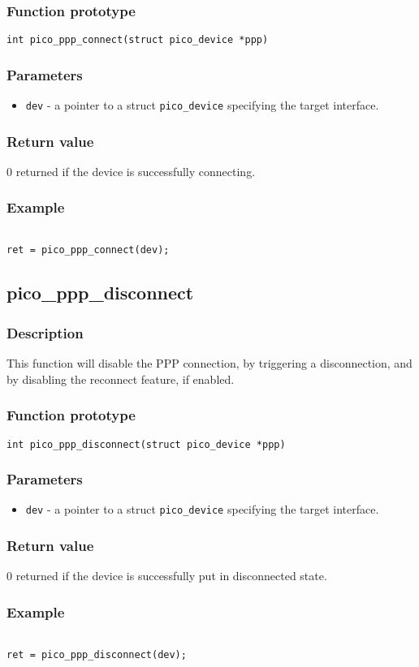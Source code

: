 \subsubsection*{Function prototype}
\texttt{int pico\_ppp\_connect(struct pico\_device *ppp)}

\subsubsection*{Parameters}
\begin{itemize}[noitemsep]
\item \texttt{dev} - a pointer to a struct \texttt{pico\_device} specifying the target interface.
\end{itemize}

\subsubsection*{Return value}
0 returned if the device is successfully connecting.

\subsubsection*{Example}
\begin{verbatim}

ret = pico_ppp_connect(dev);

\end{verbatim}
\subsection{pico\_ppp\_disconnect}
\subsubsection*{Description}
This function will disable the PPP connection, by triggering a disconnection, and by disabling the
reconnect feature, if enabled.

\subsubsection*{Function prototype}
\texttt{int pico\_ppp\_disconnect(struct pico\_device *ppp)}

\subsubsection*{Parameters}
\begin{itemize}[noitemsep]
\item \texttt{dev} - a pointer to a struct \texttt{pico\_device} specifying the target interface.
\end{itemize}

\subsubsection*{Return value}
0 returned if the device is successfully put in disconnected state.

\subsubsection*{Example}
\begin{verbatim}

ret = pico_ppp_disconnect(dev);

\end{verbatim}

